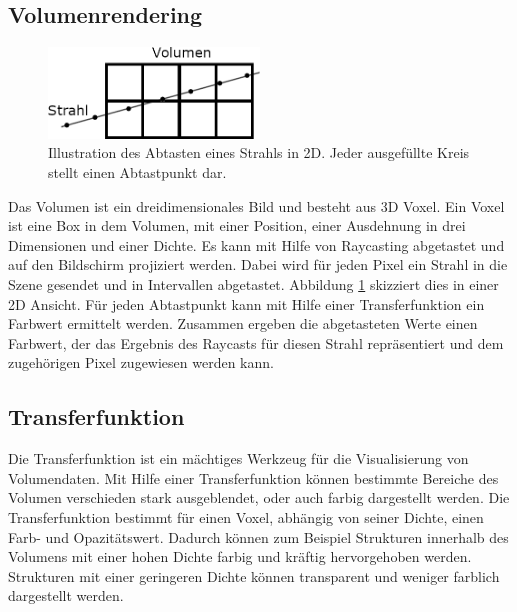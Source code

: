 \subsection{Volumenrendering}
\begin{figure}
	\centering
	\includegraphics[width=0.5\textwidth]{../../Grafiken/Abtasten_eines_Strahls.png}
	\caption{Illustration des Abtasten eines Strahls in 2D. Jeder ausgefüllte Kreis stellt einen Abtastpunkt dar.}
	\label{fig::rc04}
\end{figure}
Das Volumen ist ein dreidimensionales Bild und besteht aus 3D Voxel.
Ein Voxel ist eine Box in dem Volumen, mit einer Position, einer Ausdehnung in drei Dimensionen und einer Dichte.
Es kann mit Hilfe von Raycasting abgetastet und auf den Bildschirm projiziert werden.
Dabei wird für jeden Pixel ein Strahl in die Szene gesendet und in Intervallen abgetastet.
Abbildung \ref{fig::rc04} skizziert dies in einer 2D Ansicht.
Für jeden Abtastpunkt kann mit Hilfe einer Transferfunktion ein Farbwert ermittelt werden.
Zusammen ergeben die abgetasteten Werte einen Farbwert, der das Ergebnis des Raycasts für diesen Strahl repräsentiert und dem zugehörigen Pixel zugewiesen werden kann.

\subsection{Transferfunktion}
Die Transferfunktion ist ein mächtiges Werkzeug für die Visualisierung von Volumendaten.
Mit Hilfe einer Transferfunktion können bestimmte Bereiche des Volumen verschieden stark ausgeblendet, oder auch farbig dargestellt werden.
Die Transferfunktion bestimmt für einen Voxel, abhängig von seiner Dichte, einen Farb- und Opazitätswert.
Dadurch können zum Beispiel Strukturen innerhalb des Volumens mit einer hohen Dichte farbig und kräftig hervorgehoben werden.
Strukturen mit einer geringeren Dichte können transparent und weniger farblich dargestellt werden.


